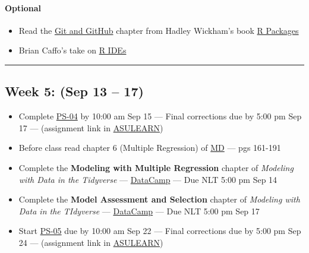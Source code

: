 \documentclass[
]{article}
\begin{document}
\begin{rmdoptional}
\hypertarget{optional}{%
\paragraph*{Optional}\label{optional}}

\begin{itemize}
\item
  Read the \href{http://r-pkgs.had.co.nz/git.html}{Git and GitHub}
  chapter from Hadley Wickham's book \href{http://r-pkgs.had.co.nz/}{R
  Packages}
\item
  Brian Caffo's take on
  \href{https://www.youtube.com/watch?v=O2UFfiGdGFA}{R IDEs}
\end{itemize}
\end{rmdoptional}

\begin{center}\rule{0.5\linewidth}{0.5pt}\end{center}

\hypertarget{week-5-sep-13-17}{%
\subsection*{Week 5: (Sep 13 -- 17)}\label{week-5-sep-13-17}}

\begin{itemize}
\item
  Complete
  \href{https://classroom.github.com/classrooms/87543903-stt3850-fall2021}{PS-04}
  by 10:00 am Sep 15 --- Final corrections due by 5:00 pm Sep 17 ---
  (assignment link in
  \href{https://asulearn.appstate.edu/course/view.php?id=131169}{ASULEARN})
\item
  Before class read chapter 6 (Multiple Regression) of
  \href{https://moderndive.com}{MD} --- pgs 161-191
\item
  Complete the \textbf{Modeling with Multiple Regression} chapter of
  \emph{Modeling with Data in the Tidyverse} ---
  \href{https://app.datacamp.com/groups/stt3850-fall2021/assignments}{DataCamp}
  --- Due NLT 5:00 pm Sep 14
\item
  Complete the \textbf{Model Assessment and Selection} chapter of
  \emph{Modeling with Data in the TIdyverse} ---
  \href{https://app.datacamp.com/groups/stt3850-fall2021/assignments}{DataCamp}
  --- Due NLT 5:00 pm Sep 17
\item
  Start
  \href{https://classroom.github.com/classrooms/87543903-stt3850-fall2021}{PS-05}
  due by 10:00 am Sep 22 --- Final corrections due by 5:00 pm Sep 24 ---
  (assignment link in
  \href{https://asulearn.appstate.edu/course/view.php?id=131169}{ASULEARN})
\end{itemize}
\end{document}
